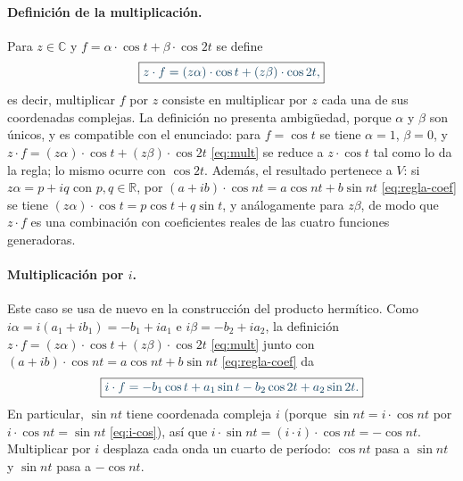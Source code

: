 \paragraph{Definición de la multiplicación.}
Para $z\in\mathbb C$ y $f=\alpha\cdot\cos t+\beta\cdot\cos 2t$ se define
\begin{equation}\label{eq:mult}
  \destacado{z\cdot f=(z\alpha)\cdot\cos t+(z\beta)\cdot\cos 2t ,}
\end{equation}
es decir, multiplicar $f$ por $z$ consiste en multiplicar por $z$ cada una de sus coordenadas
complejas. La definición no presenta ambigüedad, porque $\alpha$ y $\beta$ son únicos, y es
compatible con el enunciado: para $f=\cos t$ se tiene $\alpha=1$, $\beta=0$, y
$z\cdot f=(z\alpha)\cdot\cos t+(z\beta)\cdot\cos 2t$ \eqref{eq:mult} se reduce a $z\cdot\cos t$ tal como lo da la regla; lo mismo ocurre con
$\cos 2t$. Además, el resultado pertenece a $V$: si $z\alpha=p+iq$ con $p,q\in\mathbb R$, por
$(a+ib)\cdot\cos nt=a\cos nt+b\sin nt$ \eqref{eq:regla-coef} se tiene $(z\alpha)\cdot\cos t=p\cos t+q\sin t$, y análogamente para
$z\beta$, de modo que $z\cdot f$ es una combinación con coeficientes reales de las cuatro
funciones generadoras.

\paragraph{Multiplicación por $i$.}
Este caso se usa de nuevo en la construcción del producto hermítico. Como
$i\alpha=i(a_1+ib_1)=-b_1+ia_1$ e $i\beta=-b_2+ia_2$, la definición $z\cdot f=(z\alpha)\cdot\cos t+(z\beta)\cdot\cos 2t$ \eqref{eq:mult} junto con
$(a+ib)\cdot\cos nt=a\cos nt+b\sin nt$ \eqref{eq:regla-coef} da
\begin{equation}\label{eq:i-f}
  \destacado{i\cdot f=-b_1\cos t+a_1\sin t-b_2\cos 2t+a_2\sin 2t .}
\end{equation}
En particular, $\sin nt$ tiene coordenada compleja $i$ (porque $\sin nt=i\cdot\cos nt$ por
$i\cdot\cos nt=\sin nt$ \eqref{eq:i-cos}), así que $i\cdot\sin nt=(i\cdot i)\cdot\cos nt=-\cos nt$. Multiplicar por
$i$ desplaza cada onda un cuarto de período: $\cos nt$ pasa a $\sin nt$ y $\sin nt$ pasa a
$-\cos nt$.

